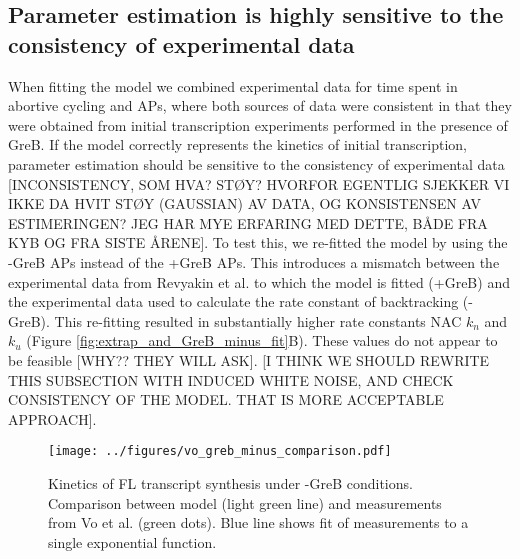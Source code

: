 \subsection{Parameter estimation is highly sensitive to the consistency of experimental data}
When fitting the model we combined experimental data for time spent in
abortive cycling and APs, where both sources of data were consistent in that
they were obtained from initial transcription experiments performed in the
presence of GreB. If the model correctly represents the kinetics of initial
transcription, parameter estimation should be sensitive to the consistency of
experimental data [INCONSISTENCY, SOM HVA? STØY? HVORFOR EGENTLIG SJEKKER VI IKKE DA HVIT STØY (GAUSSIAN) AV DATA, OG KONSISTENSEN AV ESTIMERINGEN? JEG HAR MYE ERFARING MED DETTE, BÅDE FRA KYB OG FRA SISTE ÅRENE]. To test this, we re-fitted the model by using the -GreB APs
instead of the +GreB APs. This introduces a mismatch between the experimental
data from Revyakin et al. to which the model is fitted (+GreB) and the
experimental data used to calculate the rate constant of backtracking (-GreB).
This re-fitting resulted in substantially higher rate 
constants NAC $k_n$ and $k_u$ (Figure \ref{fig:extrap_and_GreB_minus_fit}B). These values do not appear to be feasible [WHY?? THEY WILL ASK].  [I THINK WE SHOULD REWRITE THIS SUBSECTION WITH INDUCED WHITE NOISE, AND CHECK CONSISTENCY OF THE MODEL. THAT IS MORE ACCEPTABLE APPROACH].  





\begin{figure}
    \begin{center}
        \texttt{[image: ../figures/vo\_greb\_minus\_comparison.pdf]}
    \end{center}
    \caption{Kinetics of FL transcript synthesis under -GreB conditions.
      Comparison between model (light green line) and measurements from Vo
      et al. \cite{vo_vitro_2003-1} (green dots). Blue line shows fit of
      measurements to a single exponential function.}
\label{fig:vo_comparison}
\end{figure}
